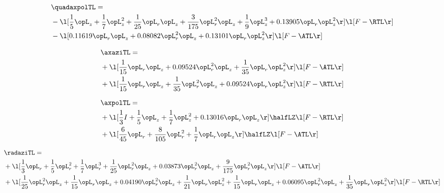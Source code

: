 \begin{alignat}{2} 
\label{eq:quadaxpolTL_2} 
& \quadaxpolTL = \\ 
& - \l[ \frac{1}{5} \opL_z + \frac{1}{7} \opL_z^{2} + \frac{1}{25} \opL_r \opL_z + \frac{3}{175} \opL_r^{2} \opL_z + \frac{1}{9} \opL_z^{3} +  0.13905 \opL_r \opL_z^{2}  \r] \l[ F - \RTL \r] \nonumber \\ 
& - \l[  0.11619 \opL_r \opL_z +  0.08082 \opL_r^{2} \opL_z +  0.13101 \opL_r \opL_z^{2}  \r] \l[ F - \ATL \r] \nonumber \\ 
\end{alignat} 


\begin{alignat}{2} 
\label{eq:linaxaziTL_2} 
& \axaziTL = \\ 
& + \l[ \frac{1}{15} \opL_r \opL_z +  0.09524 \opL_r^{2} \opL_z + \frac{1}{35} \opL_r \opL_z^{2}  \r] \l[ F - \ATL \r] \nonumber \\ 
& + \l[ \frac{1}{15} \opL_r \opL_z + \frac{1}{35} \opL_r^{2} \opL_z +  0.09524 \opL_r \opL_z^{2}  \r] \l[ F - \RTL \r] \nonumber \\ 
\end{alignat} 


\begin{alignat}{2} 
\label{eq:linaxpolTL_2} 
& \axpolTL = \\ 
& + \l[ \frac{1}{3} I + \frac{1}{5} \opL_z + \frac{1}{7} \opL_z^{2} +  0.13016 \opL_r \opL_z  \r] \halfLZ \l[ F - \RTL \r] \nonumber \\ 
& + \l[ \frac{6}{45} \opL_r + \frac{8}{105} \opL_r^{2} + \frac{1}{7} \opL_r \opL_z  \r] \halfLZ \l[ F - \ATL \r] \nonumber \\ 
\end{alignat} 


\begin{alignat}{2} 
\label{eq:linradaziTL_1} 
& \radaziTL = \\ 
& + \l[ \frac{1}{3} \opL_r + \frac{1}{5} \opL_r^{2} + \frac{1}{7} \opL_r^{3} + \frac{1}{25} \opL_r^{2} \opL_z +  0.03873 \opL_r^{2} \opL_z + \frac{9}{175} \opL_r^{2} \opL_z  \r] \l[ F - \ATL \r] \nonumber \\ 
& + \l[ \frac{1}{25} \opL_r^{2} \opL_z + \frac{1}{15} \opL_r \opL_z +  0.04190 \opL_r^{2} \opL_z + \frac{1}{21} \opL_r \opL_z^{2} + \frac{1}{15} \opL_r \opL_z +  0.06095 \opL_r^{2} \opL_z + \frac{1}{35} \opL_r \opL_z^{2}  \r] \l[ F - \RTL \r] \nonumber \\ 
\end{alignat} 


